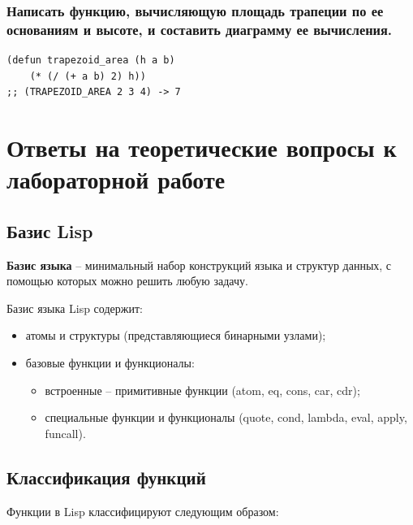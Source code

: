\documentclass[a4paper,14pt, unknownkeysallowed]{extreport}
\begin{document}
\subsection{Написать функцию, вычисляющую площадь трапеции по ее основаниям и высоте, и составить диаграмму ее вычисления.}

\begin{center}
\captionsetup{justification=raggedright,singlelinecheck=off}
\begin{lstlisting}[label=lst:parallel_processing,caption=Решение дополнительного задания 2]
(defun trapezoid_area (h a b) 
	(* (/ (+ a b) 2) h))
;; (TRAPEZOID_AREA 2 3 4) -> 7
\end{lstlisting}
\end{center}


\chapter{Ответы на теоретические вопросы к лабораторной работе}

\section{Базис Lisp}

\textbf{Базис языка} -- минимальный набор конструкций языка и структур данных, с помощью которых можно решить любую задачу.

Базис языка Lisp содержит:

\begin{itemize}
	\item атомы и структуры (представляющиеся бинарными узлами);
	\item базовые функции и функционалы:
	\begin{itemize}
		\item встроенные -- примитивные функции (atom, eq, cons, car, cdr);
		\item специальные функции и функционалы (quote, cond, lambda, eval, apply, funcall).
	\end{itemize}
\end{itemize}

\section{Классификация функций}

Функции в Lisp классифицируют следующим образом:
\end{document}
